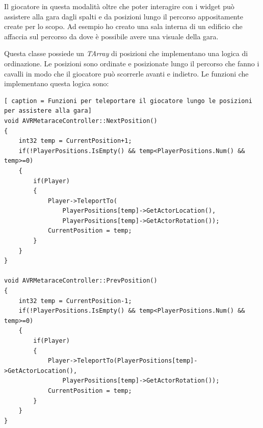     Il giocatore in questa modalità oltre che poter interagire con i widget può assistere alla gara dagli spalti e da posizioni lungo il percorso appositamente create per lo scopo.
    Ad esempio ho creato una sala interna di un edificio che affaccia sul percorso da dove è possibile avere una visuale della gara.

    Questa classe possiede un \textit{TArray} di posizioni che implementano una logica di ordinazione.
    Le posizioni sono ordinate e posizionate lungo il percorso che fanno i cavalli in modo che il giocatore può scorrerle avanti e indietro.
    Le funzioni che implementano questa logica sono:
    
    \begin{lstlisting}[ caption = Funzioni per teleportare il giocatore lungo le posizioni per assistere alla gara]
void AVRMetaraceController::NextPosition()
{
    int32 temp = CurrentPosition+1;
    if(!PlayerPositions.IsEmpty() && temp<PlayerPositions.Num() && temp>=0)
    {
        if(Player)
        {
            Player->TeleportTo(
                PlayerPositions[temp]->GetActorLocation(),
                PlayerPositions[temp]->GetActorRotation());
            CurrentPosition = temp;
        }
    }
}

void AVRMetaraceController::PrevPosition()
{
    int32 temp = CurrentPosition-1;
    if(!PlayerPositions.IsEmpty() && temp<PlayerPositions.Num() && temp>=0)
    {
        if(Player)
        {
            Player->TeleportTo(PlayerPositions[temp]->GetActorLocation(),
                PlayerPositions[temp]->GetActorRotation());
            CurrentPosition = temp;
        }
    }
}
    \end{lstlisting}



